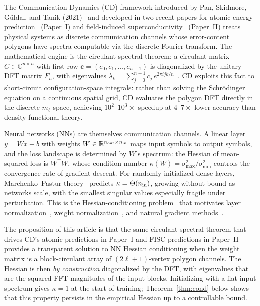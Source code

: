\documentclass[aps,prx,onecolumn,11pt,nofootinbib,longbibliography]{revtex4-2}
\newcommand{\Real}{\mathbb{R}}
\newcommand{\Complex}{\mathbb{C}}
\begin{document}
The Communication Dynamics (CD) framework introduced by Pan, Skidmore,
G\"uldal, and Tanik (2021)~\cite{Pan2021} and developed in two recent papers
for atomic energy prediction~\cite{PaperI} (Paper~I) and field-induced
superconductivity~\cite{PaperII} (Paper~II) treats physical systems as
discrete communication channels whose error-content polygons have spectra
computable via the discrete Fourier transform.  The mathematical engine is
the circulant spectral theorem: a circulant matrix $C\in\Complex^{n\times n}$
with first row $\mathbf{c} = (c_0, c_1, \ldots, c_{n-1})$ is diagonalized by
the unitary DFT matrix $F_n$, with eigenvalues
$\lambda_k = \sum_{j=0}^{n-1} c_j\, e^{2\pi i jk/n}$~\cite{Gray2006}.  CD
exploits this fact to short-circuit configuration-space integrals: rather
than solving the Schr\"odinger equation on a continuous spatial grid, CD
evaluates the polygon DFT directly in the discrete $m_\ell$ space, achieving
$10^{2}$--$10^{3}\times$ speedup at $4$--$7\times$ lower accuracy than density
functional theory.

Neural networks (NNs) are themselves communication channels.  A linear layer
$y = Wx + b$ with weights $W \in \Real^{n_{\rm out}\times n_{\rm in}}$ maps
input symbols to output symbols, and the loss landscape is determined by
$W$'s spectrum: the Hessian of mean-squared loss is $W^\top W$, whose
condition number $\kappa(W) = \sigma_{\max}^2/\sigma_{\min}^2$ controls the
convergence rate of gradient descent.  For randomly initialized dense
layers, Marchenko--Pastur theory~\cite{MarchenkoPastur} predicts
$\kappa = \Theta(n_{\rm in})$, growing without bound as networks scale, with
the smallest singular values especially fragile under perturbation.  This
is the Hessian-conditioning problem~\cite{LeCun1991} that motivates layer
normalization~\cite{LayerNorm}, weight normalization~\cite{WeightNorm}, and
natural gradient methods~\cite{Amari1998}.

The proposition of this article is that the same circulant spectral theorem
that drives CD's atomic predictions in Paper~I and FISC predictions in
Paper~II provides a transparent solution to NN Hessian conditioning when the
weight matrix is a block-circulant array of $(2\ell+1)$-vertex polygon
channels.  The Hessian is then \emph{by construction} diagonalized by the DFT,
with eigenvalues that are the squared FFT magnitudes of the input blocks.
Initializing with a flat input spectrum gives $\kappa = 1$ at the start of
training; Theorem~\ref{thm:cond} below shows that this property persists in
the empirical Hessian up to a controllable bound.
\end{document}
